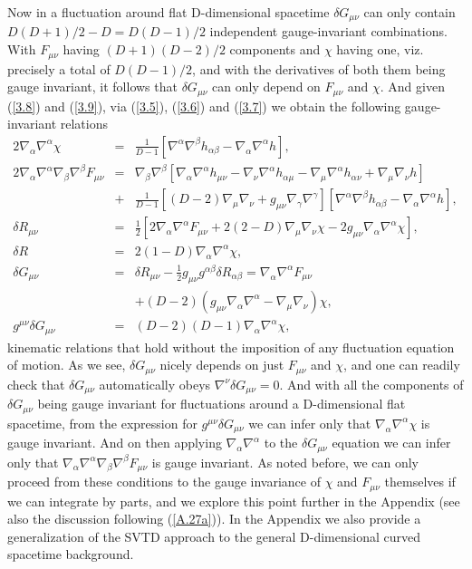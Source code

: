Now in a fluctuation around flat D-dimensional spacetime $\delta G_{\mu\nu}$ can only contain $D(D+1)/2-D=D(D-1)/2$ independent gauge-invariant combinations. With $F_{\mu\nu}$ having $(D+1)(D-2)/2$ components and $\chi$ having one, viz. precisely a total of $D(D-1)/2$, and  with the derivatives of both them being gauge invariant, it follows that $\delta G_{\mu\nu}$ can only depend on $F_{\mu\nu}$ and $\chi$. And given (\ref{3.8}) and (\ref{3.9}), via (\ref{3.5}), (\ref{3.6}) and (\ref{3.7}) we obtain  the following gauge-invariant relations
%
\begin{eqnarray}
2\nabla_{\alpha}\nabla^{\alpha}\chi&=&\frac{1}{D-1}\left[\nabla^{\alpha}\nabla^{\beta}h_{\alpha\beta}-\nabla_{\alpha}\nabla^{\alpha}h\right],
\nonumber\\
2\nabla_{\alpha}\nabla^{\alpha}\nabla_{\beta}\nabla^{\beta}F_{\mu\nu}&=&\nabla_{\beta}\nabla^{\beta}\left[\nabla_{\alpha}\nabla^{\alpha}h_{\mu\nu}-\nabla_{\nu}\nabla^{\alpha}h_{\alpha\mu}-\nabla_{\mu}\nabla^{\alpha}h_{\alpha\nu}+\nabla_{\mu}\nabla_{\nu}h\right]
\nonumber\\
&+&\frac{1}{D-1}\left[(D-2)\nabla_{\mu}\nabla_{\nu}+g_{\mu\nu}\nabla_{\gamma}\nabla^{\gamma}\right][\nabla^{\alpha}\nabla^{\beta}h_{\alpha\beta}-\nabla_{\alpha}\nabla^{\alpha}h],
\nonumber\\
\delta R_{\mu\nu}&=&\frac{1}{2}[2\nabla_{\alpha}\nabla^{\alpha}F_{\mu\nu}+2(2-D)\nabla_{\mu}\nabla_{\nu}\chi-2g_{\mu\nu}\nabla_{\alpha}\nabla^{\alpha}\chi],
\nonumber\\
 \delta R&=&2(1-D)\nabla_{\alpha}\nabla^{\alpha}\chi,
\nonumber\\
\delta G_{\mu\nu}&=&\delta R_{\mu\nu}-\frac{1}{2}g_{\mu\nu}g^{\alpha\beta}\delta R_{\alpha\beta}=\nabla_{\alpha}\nabla^{\alpha}F_{\mu\nu}
\nonumber\\
&&+(D-2)(g_{\mu\nu}\nabla_{\alpha}\nabla^{\alpha}-\nabla_{\mu}\nabla_{\nu})\chi,
\nonumber\\
g^{\mu\nu}\delta G_{\mu\nu}&=&(D-2)(D-1)\nabla_{\alpha}\nabla^{\alpha}\chi,
\label{3.10}
\end{eqnarray}
%
kinematic relations that hold without the imposition of any fluctuation equation of motion. As we see, $\delta G_{\mu\nu}$ nicely depends  on just $F_{\mu\nu}$ and $\chi$, and one can readily check that $\delta G_{\mu\nu}$ automatically obeys $\nabla^{\nu}\delta G_{\mu\nu}=0$.  And with all the components of $\delta G_{\mu\nu}$ being gauge invariant for fluctuations around a D-dimensional flat spacetime,  from the expression for $g^{\mu\nu}\delta G_{\mu\nu}$  we can infer only that $\nabla_{\alpha}\nabla^{\alpha}\chi$ is gauge invariant. And on then applying $\nabla_{\alpha}\nabla^{\alpha}$ to the $\delta G_{\mu\nu}$ equation we can infer only that $\nabla_{\alpha}\nabla^{\alpha}\nabla_{\beta}\nabla^{\beta}F_{\mu\nu}$ is gauge invariant. As noted before, we can only proceed from these conditions to the gauge invariance of $\chi$ and $F_{\mu\nu}$ themselves if we can integrate by parts, and we explore this point further in the Appendix (see also the discussion following (\ref{A.27a})). In the Appendix we also provide a generalization of the SVTD approach to the general D-dimensional curved spacetime background.


